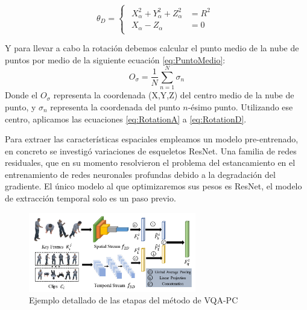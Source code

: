 \begin{equation}
  \theta_D = 
\begin{cases}
\begin{aligned}
   X_\alpha^2 + Y_\alpha^2 + Z_\alpha^2 & = R^2 \\ 
    X_\alpha - Z_\alpha & = 0 
\end{aligned}
\end{cases}
\label{eq:RotationD}
\end{equation}

Y para llevar a cabo la rotación debemos calcular el punto medio de la nube 
de puntos por medio de la siguiente ecuación \eqref{eq:PuntoMedio}:
\begin{equation}
  O_\sigma = \frac{1}{N}\sum_{n=1}^N \sigma_n
  \label{eq:PuntoMedio}
\end{equation}
Donde el $O_\sigma$ representa la coordenada (X,Y,Z) del centro medio de la 
nube de punto, y $\sigma_n$ representa la coordenada del punto $n$-ésimo punto. 
Utilizando ese centro, aplicamos las ecuaciones \eqref{eq:RotationA} a \eqref{eq:RotationD}.

Para extraer las características espaciales empleamos un modelo pre-entrenado, 
en concreto se investigó variaciones de esqueletos ResNet\cite{ResNet}. Una 
familia de redes residuales, que en su momento resolvieron el problema 
del estancamiento en el entrenamiento de redes neuronales profundas debido 
a la degradación del gradiente. El único modelo al que optimizaremos sus pesos es 
ResNet, el modelo de extracción temporal solo es un paso previo.

\begin{figure}[htp]
  \begin{center}
    \includegraphics[width=0.65\textwidth]{imagenes/chapter4/PipelineCompleto}
  \end{center}
  \caption{Ejemplo detallado de las etapas del método de VQA-PC}
  \label{fig:VQAPipeline}
\end{figure}

